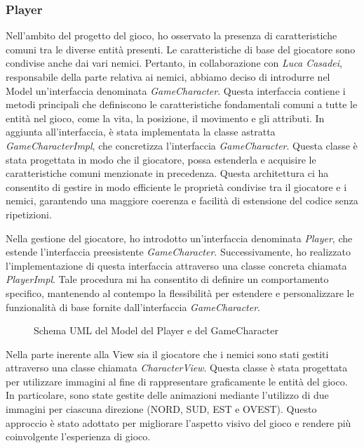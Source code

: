 \documentclass[a4paper,12pt]{report}
\begin{document}
\subsubsection{Player}
Nell'ambito del progetto del gioco, ho osservato la presenza di caratteristiche comuni tra le diverse entità presenti. Le caratteristiche di base del giocatore sono condivise anche dai vari nemici. 
Pertanto, in collaborazione con \textit{Luca Casadei}, responsabile della parte relativa ai nemici, abbiamo deciso di introdurre nel Model un'interfaccia denominata \textit{GameCharacter}. Questa interfaccia contiene i metodi principali che definiscono le caratteristiche fondamentali comuni a tutte le entità nel gioco, come la vita, la posizione, il movimento e gli attributi.
In aggiunta all'interfaccia, è stata implementata la classe astratta \textit{GameCharacterImpl}, che concretizza l'interfaccia \textit{GameCharacter}. Questa classe è stata progettata in modo che il giocatore, possa estenderla e acquisire le caratteristiche comuni menzionate in precedenza. Questa architettura ci ha consentito di gestire in modo efficiente le proprietà condivise tra il giocatore e i nemici, garantendo una maggiore coerenza e facilità di estensione del codice senza ripetizioni.

Nella gestione del giocatore, ho introdotto un'interfaccia denominata \textit{Player}, che estende l'interfaccia preesistente \textit{GameCharacter}. Successivamente, ho realizzato l'implementazione di questa interfaccia attraverso una classe concreta chiamata \textit{PlayerImpl}. Tale procedura mi ha consentito di definire un comportamento specifico, mantenendo al contempo la flessibilità per estendere e personalizzare le funzionalità di base fornite dall'interfaccia \textit{GameCharacter}.

\begin{figure}[H]
	\centering
	
	\caption{Schema UML del Model del Player e del GameCharacter}
	\label{fig:the-exiled-player-uml}
\end{figure}

Nella parte inerente alla View sia il giocatore che i nemici sono stati gestiti attraverso una classe chiamata \textit{CharacterView}. Questa classe è stata progettata per utilizzare immagini al fine di rappresentare graficamente le entità del gioco. In particolare, sono state gestite delle animazioni mediante l'utilizzo di due immagini per ciascuna direzione (NORD, SUD, EST e OVEST). Questo approccio è stato adottato per migliorare l'aspetto visivo del gioco e rendere più coinvolgente l'esperienza di gioco. 
\end{document}
